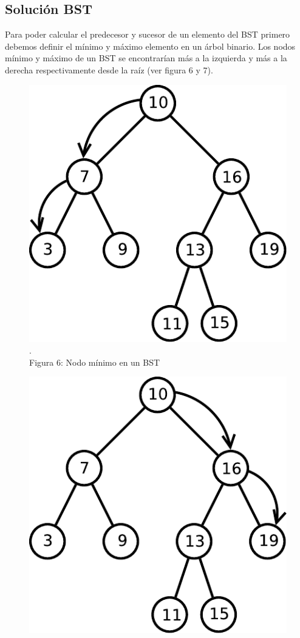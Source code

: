 \documentclass[11pt]{article}
\begin{document}
\subsection{Solución BST}
Para poder calcular el predecesor y sucesor de un elemento del BST primero debemos definir el mínimo y máximo elemento en un árbol binario. Los nodos mínimo y máximo de un BST se encontrarían más a la izquierda y más a la derecha respectivamente desde la raíz (ver figura 6 y 7). 
\begin{figure}[htp]
\centering
\begin{minipage}{.4\textwidth}
\centering
\includegraphics[scale=0.5]{min_arbol.pdf}
\\\scriptsize{\color{white}.\color{black}\\Figura 6: Nodo mínimo en un BST}
\label{etiqueta}
\end{minipage}
\begin{minipage}{.4\textwidth}
\centering
\includegraphics[scale=0.5]{max_arbol.pdf}

\end{minipage}
\end{figure}
\end{document}
